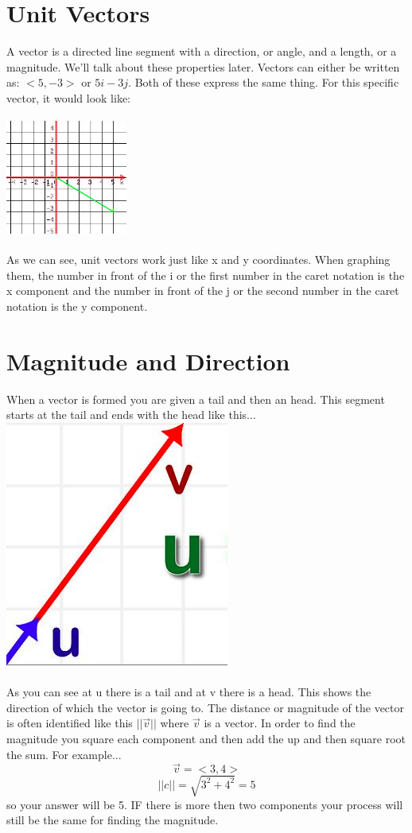 \documentclass[a4paper,openright, 14pt]{article}
\begin{document}
\section*{Unit Vectors}
A vector is a directed line segment with a direction, or angle, and a length, or a magnitude. We'll talk about these properties later. Vectors can either be written as:
$<5,-3>$ or $5i-3j$. Both of these express the same thing. For this specific vector, it would look like:
\begin{center}
    \includegraphics[width=4cm, height=4cm]{Images/unit.png}
\end{center}
As we can see, unit vectors work just like x and y coordinates. When graphing them, the number in front of the i or the first number in the caret notation is the x component and the number in front of the j or the second number in the caret notation is the y component. 
\section*{Magnitude and Direction}
When a vector is formed you are given a tail and then an head. This segment starts at the tail and ends with the head like this...\\
\includegraphics[width = 7 cm, height = 5 cm]{norm.png}
\\\\
As you can see at u there is a tail and at v there is a head. This shows the direction of which the vector is going to. The distance or magnitude of the vector is often identified like this $||\overrightarrow{v}||$ where $\overrightarrow{v}$ is a vector. In order to find the magnitude you square each component and then add the up and then square root the sum. For example...
$$\overrightarrow{v}=<3,4>$$
$$||c||=\sqrt{3^2 +4^2}=5$$
so your answer will be 5. IF there is more then two components your process will still be the same for finding the magnitude.\\\\
\end{document}

